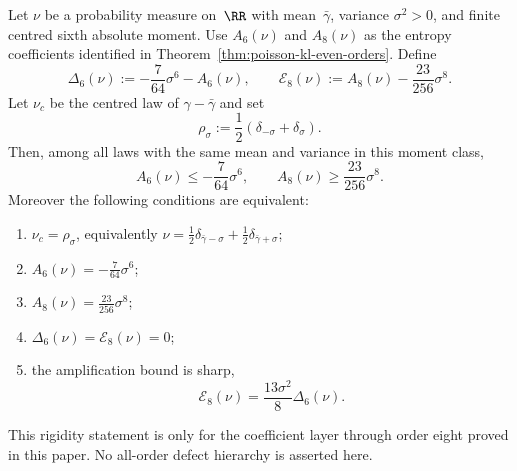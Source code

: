 \begin{corollary}%
\label{cor:poisson-two-point-defect-rigidity}
Let $\nu$ be a probability measure on~$\RR$ with mean~$\bar{\gamma}$,
variance $\sigma^2>0$, and finite centred sixth absolute moment.  Use
\(A_6(\nu)\) and \(A_8(\nu)\) as the entropy coefficients identified in
Theorem~\ref{thm:poisson-kl-even-orders}.
Define
\[
\Delta_6(\nu)
:=-\frac{7}{64}\sigma^6-A_6(\nu),
\qquad
\mathcal E_8(\nu)
:=A_8(\nu)-\frac{23}{256}\sigma^8.
\]
Let $\nu_c$ be the centred law of $\gamma-\bar{\gamma}$ and set
\[
\rho_\sigma:=\frac12(\delta_{-\sigma}+\delta_\sigma).
\]
Then, among all laws with the same mean and variance in this moment class,
\[
A_6(\nu)\le -\frac{7}{64}\sigma^6,
\qquad
A_8(\nu)\ge \frac{23}{256}\sigma^8.
\]
Moreover the following conditions are equivalent:
\begin{enumerate}[label=\textup{(\roman*)},leftmargin=*]
\item $\nu_c=\rho_\sigma$, equivalently
$\nu=\frac12\delta_{\bar{\gamma}-\sigma}
+\frac12\delta_{\bar{\gamma}+\sigma}$;
\item \(A_6(\nu)=-\frac{7}{64}\sigma^6\);
\item \(A_8(\nu)=\frac{23}{256}\sigma^8\);
\item \(\Delta_6(\nu)=
\mathcal E_8(\nu)=0\);
\item the amplification bound is sharp,
\[
\mathcal E_8(\nu)
=\frac{13\sigma^2}{8}\Delta_6(\nu).
\]
\end{enumerate}
\end{corollary}

\begin{remark}
This rigidity statement is only for the coefficient layer through order eight proved in
this paper.  No all-order defect hierarchy is asserted here.
\end{remark}

